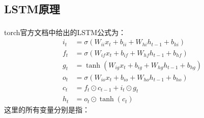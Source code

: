 \documentclass[12pt, oneside, a4paper]{ctexart}
\begin{document}
\subsection{LSTM原理}
\par{}
torch官方文档中给出的LSTM公式\textsuperscript{\color{red}\cite{ref2}}为：
\begin{align*}
    i_t & = \sigma(W_{ii}x_t + b_{ii} + W_{hi}h_{t-1} + b_{hi}) \\
    f_t & = \sigma(W_{if}x_t + b_{if} + W_{hf}h_{t-1} + b_{hf}) \\
    g_t & = \tanh(W_{ig}x_t + b_{ig} + W_{hg}h_{t-1} + b_{hg})  \\
    o_t & = \sigma(W_{io}x_t + b_{io} + W_{ho}h_{t-1} + b_{ho}) \\
    c_t & = f_t \odot c_{t-1} + i_t \odot g_t                   \\
    h_t & = o_t \odot \tanh(c_t)
\end{align*}
这里的所有变量分别是指：
\end{document}
